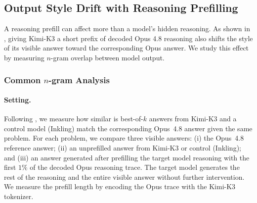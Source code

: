 \clearpage
\subsection{Output Style Drift with Reasoning Prefilling}\label{app:output_drift}

A reasoning prefill can affect more than a model's hidden reasoning. As shown in , giving Kimi-K3 a short prefix of decoded Opus 4.8 reasoning also shifts the style of its visible answer toward the corresponding Opus answer. We study this effect  by measuring $n$-gram overlap between model output. 

\label{app:prefill_qualitative}

\subsubsection{Common $n$-gram Analysis}


\paragraph{Setting.}  Following \citet{barbero2026extracting}, we measure how similar is best-of-$k$ answers from Kimi-K3 and a control model (Inkling) match the corresponding Opus~4.8 answer given the same problem. For each problem, we compare three visible answers: (i) the Opus~4.8 reference answer; (ii) an unprefilled answer from Kimi-K3 or control (Inkling); and (iii) an answer generated after prefilling the target model reasoning with the first $1\%$ of the decoded Opus reasoning trace. The target model generates the rest of the reasoning and the entire visible answer without further intervention. We measure the prefill length by encoding the Opus trace with the Kimi-K3 tokenizer.  

